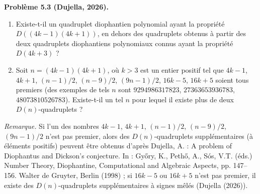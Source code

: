 \textbf{Problème 5.3 (Dujella, 2026).} \begin{enumerate}
\item Existe-t-il un quadruplet diophantien polynomial ayant la propriété $D((4k-1)(4k+1))$, en dehors des quadruplets obtenus à partir des deux quadruplets diophantiens polynomiaux connus ayant la propriété $D(4k+3)$ ?
\item Soit $n=(4k-1)(4k+1)$, où $k>3$ est un entier positif tel que $4k-1$, $4k+1$, $(n-1)/2$, $(n-9)/2$, $(9n-1)/2$, $16k-5$, $16k+5$ soient tous premiers (des exemples de tels $n$ sont $9294986317823$, $27363653936783$, $48073810526783$). Existe-t-il un tel $n$ pour lequel il existe plus de deux $D(n)$-quadruplets ?
\end{enumerate}

\medskip

\textit{Remarque.} Si l'un des nombres $4k-1$, $4k+1$, $(n-1)/2$, $(n-9)/2$, $(9n-1)/2$ n'est pas premier, alors des $D(n)$-quadruplets supplémentaires (à éléments positifs) peuvent être obtenus d'après Dujella, A. : A problem of Diophantus and Dickson's conjecture. In : Győry, K., Pethő, A., Sós, V.T. (éds.) Number Theory, Diophantine, Computational and Algebraic Aspects, pp. 147--156. Walter de Gruyter, Berlin (1998) ; si $16k-5$ ou $16k+5$ n'est pas premier, il existe des $D(n)$-quadruplets supplémentaires à signes mêlés (Dujella (2026)).

